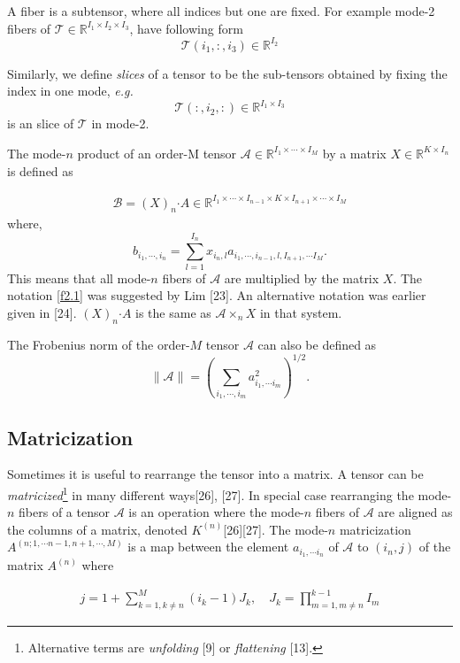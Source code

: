 \documentclass[journal]{IEEEtran}
\begin{document}
	A fiber is a subtensor, where all indices but one are fixed. For
	example mode-2 fibers of $\mathcal{T} \in \mathbb{R}^{I_1 \times I_2 \times I_3 }$, have following form
	\[
	\mathcal{T}(i_1,:,i_3)\in \mathbb{R}^{I_2}
	\]
	
	Similarly, we define \textit{slices} of a tensor to be the sub-tensors obtained by fixing the index in one mode, \textit{e.g.} 
	\[
	\mathcal{T}(:,i_2,:)\in \mathbb{R}^{I_1 \times I_3}
	\]
	is an slice of $\mathcal{T}$ in mode-2. 
	
	The mode-$n$ product of an order-M tensor $\mathcal{A}  \in \mathbb{R}^{I_1 \times \cdots \times I_M}$ by a matrix $X \in \mathbb{R}^{K \times I_n}$ is defined as 
	
	\begin{align}\label{f2.1}
	\mathcal{B} = (X)_n \boldsymbol{\cdot}	A \in \mathbb{R}^{I_1 \times \cdots \times I_{n-1} \times K \times I_{n + 1} \times \cdots \times I_M}
	\end{align}
	where,
	\[
	b_{i_1, \cdots, i_n} = \sum_{l = 1}^{I_n} x_{i_n, l} a_{i_1,\cdots, i_{n-1}, l, I_{n+1}, \cdots I_M }.
	\]
	This means that all mode-$n$ fibers of $\mathcal{A}$ are multiplied by the
	matrix $X$. The notation \eqref{f2.1} was suggested by Lim [23]. An alternative notation was earlier given in [24]. $ (X)_n \boldsymbol{\cdot}	A$ is the same as $\mathcal{A} \times_n X$ in that system. 
	
	The Frobenius norm of the order-$M$ tensor $\mathcal{A}$ can also be defined as 
	\[
	\|  \mathcal{A} \| = \left( \sum_{i_1, \cdots, i_m} a^2_{i_1, \cdots i_m} \right)^{1/2} .
	\]
	
	
	\subsection{Matricization}
	Sometimes it is useful to rearrange the tensor into a matrix. A tensor can be \textit{matricized}\footnote{Alternative terms are \textit{unfolding} [9] or \textit{flattening} [13].} in many different ways[26], [27]. In special case rearranging the mode-$n$  fibers of a tensor $\mathcal{A}$ is an operation where the mode-$n$ fibers of $\mathcal{A}$ are aligned as the columns of a matrix, denoted $K^{(n)}$[26][27]. The mode-$n$ matricization $A^{ ( n; 1,\cdots n-1,n+1,\cdots ,M ) }$ is a map between the element $a_{i_1,\cdots i_n}$ of $\mathcal{A}$ to $(i_n, j)$ of the matrix $A^{(n)}$ where 
	
	\begin{align*}
	j = 1+\sum_{k=1, k \neq n}^{M}(i_k - 1)J_k, \quad J_k = \prod_{m =1, m\neq n}^{k-1} I_m
	\end{align*}
	
\end{document}
